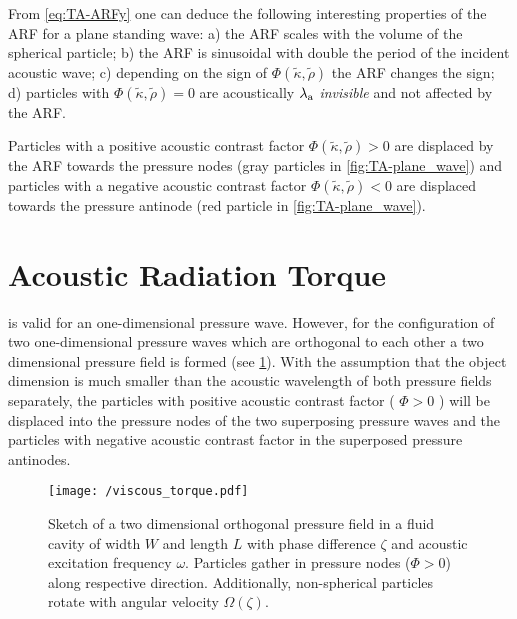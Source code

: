 From \cref{eq:TA-ARFy} one can deduce the following interesting properties of 
the ARF for a plane standing wave: a) the ARF scales with the volume of the 
spherical particle; b) the ARF is sinusoidal with double the period of the 
incident acoustic wave; c) depending on the sign of $\Phi(\tilde{\kappa}, 
\tilde{\rho})$ the ARF changes the sign; d) particles with 
$\Phi(\tilde{\kappa}, \tilde{\rho}) = 0$ are acoustically 
$\lambda_{\mathrm{a}}$
\emph{invisible} and not affected by the ARF.

Particles with a positive acoustic contrast factor $\Phi(\tilde{\kappa}, 
\tilde{\rho}) > 0$ are displaced by the ARF towards the pressure nodes (gray 
particles in \cref{fig:TA-plane_wave}) and particles with a negative acoustic 
contrast factor $\Phi(\tilde{\kappa}, \tilde{\rho}) < 0$ are displaced towards 
the pressure antinode (red particle in \cref{fig:TA-plane_wave}).



\section{Acoustic Radiation Torque\label{sec:TA-VT}}

 is valid for an one-dimensional pressure wave. However, for 
the configuration of two one-dimensional pressure waves which are orthogonal to 
each other a two dimensional pressure field is formed (see 
\cref{fig:TA-viscous_torque}). With the assumption that the object dimension is 
much smaller than the acoustic wavelength of both pressure fields separately, 
the particles with positive acoustic contrast factor ( $\Phi>0$ ) will be 
displaced into the pressure nodes of the two superposing pressure waves and the 
particles with negative acoustic contrast factor in the superposed pressure 
antinodes.

\begin{figure}[tbp]
  \centering
  \texttt{[image: /viscous\_torque.pdf]}
  \caption{Sketch of a two dimensional orthogonal pressure field in a fluid 
    cavity of width $W$ and length $L$ with phase difference $\zeta$ and 
  acoustic excitation frequency $\omega$. Particles gather in pressure nodes 
($\Phi > 0$) along respective direction. Additionally, non-spherical particles 
rotate with angular velocity $\Omega\left( \zeta \right)$.}
  \label{fig:TA-viscous_torque}
\end{figure}

